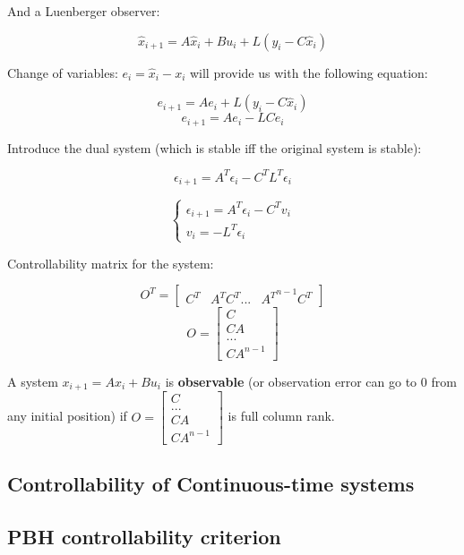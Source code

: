 And a Luenberger observer:

\[
\hat{x}_{i+1} = A\hat{x}_i + Bu_i + L(y_i - C \hat{x}_i)
\]

Change of variables: $e_i = \hat{x}_i - x_i$ will provide us with the following equation:

\[
e_{i+1} = Ae_i + L(y_i - C \hat{x}_i)
\]
\[
e_{i+1} = Ae_i - LCe_i
\]

Introduce the dual system (which is stable iff the original system is stable):

\[
\epsilon_{i+1} = A^T\epsilon_i - C^T L^T\epsilon_i
\]

\[
\begin{cases}
    \epsilon_{i+1} = A^T \epsilon_i - C^T v_i \\
    v_i = - L^T \epsilon_i
\end{cases}
\]

Controllability matrix for the system:

\[O^T = \begin{bmatrix} C^T & A^T C^T ... & {A^T}^{n-1} C^T \end{bmatrix}\]
\[O = \begin{bmatrix} C \\ CA \\ ... \\ CA^{n-1} \end{bmatrix} \]



\begin{tcolorbox}[colback=green!10,colframe=green!50!black,title=\textbf{Observability}]
    A system $x_{i+1} = Ax_i + Bu_i$ is \textbf{observable} (or observation error can go to 0 from any initial position) if $O = \begin{bmatrix} C \\ ... \\CA \\ CA^{n-1} \end{bmatrix}$
    is full column rank.
\end{tcolorbox}

\subsection{Controllability of Continuous-time systems}

\subsection{PBH controllability criterion}

